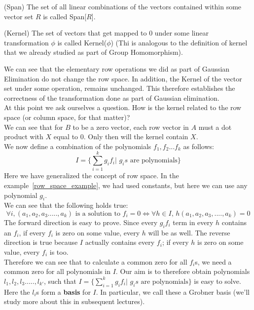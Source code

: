 \begin{definition} (Span) 
The set of all linear combinations of the vectors contained within some vector set $R$ is called Span[$R$].
\end{definition}

\begin{definition} (Kernel)
The set of vectors that get mapped to $0$ under some linear transformation $\phi$ is called Kernel($\phi$) (Thi is analogous to the definition of kernel that we already studied as part of Group Homomorphism).
\end{definition}

We can see that the elementary row operations we did as part of Gaussian Elimination do not change the row space. In addition, the Kernel of the vector set under some operation, remains unchanged. This therefore establishes the correctness of the transformation done as part of Gaussian elimination.\\
At this point we ask ourselves a question. How is the kernel related to the row space (or column space, for that matter)?\\
We can see that for $B$ to be a zero vector, each row vector in $A$ must a dot product with $X$ equal to 0. Only then will the kernel contain $X$.\\

We now define a combination of the polynomials $f_1,f_2...f_k$ as follows:\\
\[
I = \{\sum\limits_{i=1}^{k} g_{i}f_{i}| \text{~}g_{i}s \text{~are polynomials}\}
\]
Here we have generalized the concept of row space. In the example~\ref{row_space_example}, we had used constants, but here we can use any polynomial $g_i$.\\
We can see that the following holds true:
\begin{equation}
 \forall i, (a_1,a_2,a_3.....,a_k)\text{~is a solution to~}f_i=0 \Leftrightarrow \forall h \in I \text{,~}h(a_1,a_2,a_3,....,a_k)=0
\end{equation}
The forward direction is easy to prove. Since every $g_{i}f_{i}$ term in every $h$ contains an $f_i$, if every $f_i$ is zero on some value, every $h$ will be as well. The reverse direction is true because $I$ actually contains every $f_i$; if every $h$ is zero on some value, every $f_i$ is too.\\
Therefore we can see that to calculate a common zero for all $f_i$s, we need a common zero for all polynomials in $I$. Our aim is to therefore obtain polynomials $l_1,l_2,l_3.....,l_{k'}$, such that $I = \{\sum\limits_{i=1}^{k} g_{i}f_{i}| \text{~}g_{i}s \text{~are polynomials}\}$ is easy to solve. Here the $l_i$s form a \textbf{basis} for $I$. In particular, we call these a Grobner basis (we'll study more about this in subsequent lectures).\\

